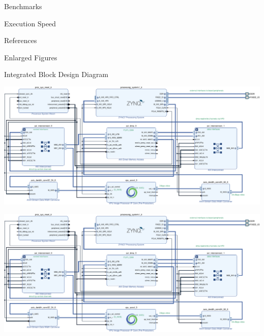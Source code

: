\documentclass{matthijs}
\begin{document}
\begin{hoofdstuk}{Benchmarks}
\begin{paragraaf}{Execution Speed}
		\end{paragraaf}

	\end{hoofdstuk}
	
	\begin{hoofdstuk}{References}

		\printbibliography[heading=none]

	\end{hoofdstuk}

	\begin{appendices}
		\begin{hoofdstuk}{Enlarged Figures}
			\begin{paragraaf}{Integrated Block Design Diagram}
				\vspace{0.25cm}
				\centerline{\includegraphics[angle=90, origin=c, clip, trim=9.45cm 0 0 0, width=1.25\textwidth]{hw-block-diagram-crop-asset.pdf}}
				\clearpage
				\centerline{\includegraphics[angle=90, origin=c, clip, trim=0 0 9.45cm 0, width=1.25\textwidth]{hw-block-diagram-crop-asset.pdf}}
			\end{paragraaf}
		\end{hoofdstuk}
	\end{appendices}

	\clearpage
	\thispagestyle{empty}
	\addtocounter{page}{-1}
	\
	\clearpage
\end{document}
